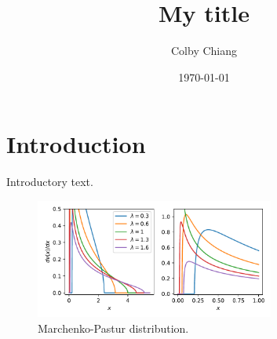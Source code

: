 \documentclass[a4paper,10pt]{article}
\title{My title}
\author{Colby Chiang}
\date{\today}
\begin{document}
\maketitle

\section*{Introduction}
Introductory text.

\begin{figure}[ht]
    \centering
    \includegraphics[width=0.7\textwidth]{Marchenko-Pastur_distribution.pdf}
    \caption{Marchenko-Pastur distribution.}
    \label{fig:mp-dist} %
  \end{figure}

% 
\end{document}

